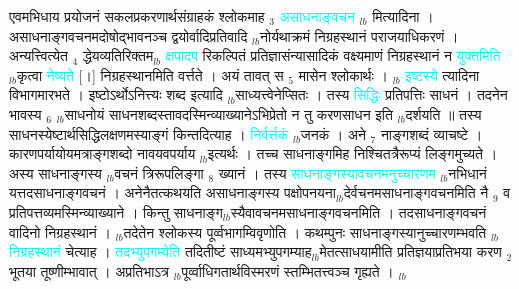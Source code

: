 \documentclass[article,12pt,a4paper]{memoir}%
\newcommand{\quotelemma}[1]{\textcolor{cyan}{#1}}
\newcounter{parCount}
\begin{document}
	  
	  \pstart \leavevmode%
	एवमभिधाय प्रयोजनं सकलप्रकरणार्थसंग्राहकं श्लोकमाह {\tiny $_{3}$} \quotelemma{असाधनाङ्वचन} {\tiny $_{lb}$} \cite[1b1]{vn-msN} मित्यादिना । असाधनाङ्गवचनमदोषोद्भावनञ्च द्वयोर्वादिप्रतिवादि {\tiny $_{lb}$}नोर्यथाक्रमं निग्रहस्थानं पराजयाधिकरणं । अन्यत्त्वित्येत {\tiny $_{4}$} द्धेयव्यतिरिक्तम{\tiny $_{lb}$} \quotelemma{क्षपादप} रिकल्पितं प्रतिज्ञासंन्यासादिकं वक्ष्यमाणं निग्रहस्थानं न \quotelemma{युक्तमिति} {\tiny $_{lb}$}कृत्वा \quotelemma{नेष्यते} [।] निग्रहस्थानमिति वर्त्तते । अयं तावत् स {\tiny $_{5}$} मासेन श्लोकार्थः । {\tiny $_{lb}$} \quotelemma{इष्टस्ये} \cite[1b1]{vn-msN} त्यादिना विभागमारभते । इष्टोऽर्थोऽनित्त्यः शब्द इत्यादि {\tiny $_{lb}$}साध्यत्त्वेनेप्सितः । तस्य \quotelemma{सिद्धिः} प्रतिपत्तिः साधनं । तदनेन भावस्य {\tiny $_{6}$} {\tiny $_{lb}$}साधनोयं साधनशब्दस्तावदस्मिन्व्याख्यानेऽभिप्रेतो न तु करणसाधन इति {\tiny $_{lb}$}दर्शयति ॥ तस्य साधनस्येष्टार्थसिद्धिलक्षणमस्याङ्गं किन्तदित्याह । \quotelemma{निर्वर्त्तकं} {\tiny $_{lb}$}जनकं । अने {\tiny $_{7}$} नाङ्गशब्दं व्याचष्टे । कारणपर्यायोयमत्राङ्गशब्दो नावयवपर्याय {\tiny $_{lb}$}इत्यर्थः । तच्च साधनाङ्गमिह निश्चितत्रैरूप्यं लिङ्गमुच्यते । अस्य साधनाङ्गस्य {\tiny $_{lb}$}वचनं त्रिरूपलिङ्गा {\tiny $_{8}$} ख्यानं । तस्य \quotelemma{साधनाङ्गस्यावचनमनुच्चारणम} \cite[1b2]{vn-msN} {\tiny $_{lb}$}नभिधानं यत्तदसाधनाङ्गवचनं । अनेनैतत्कथयति असाधनाङ्गस्य पक्षोपनयना{\tiny $_{lb}$}देर्वचनमसाधनाङ्गवचनमिति नै {\tiny $_{9}$}\leavevmode{} व प्रतिपत्तव्यमस्मिन्व्याख्याने । किन्तु साधनाङ्ग{\tiny $_{lb}$}स्यैवावचनमसाधनाङ्गवचनमिति । तदसाधनाङ्गवचनं वादिनो निग्रहस्थानं । {\tiny $_{lb}$}तदेतेन श्लोकस्य पूर्व्वभागम्विवृणोति । कथम्पुनः साधनाङ्गस्यानुच्चारणम्भवति {\tiny $_{lb}$} \quotelemma{निग्रहस्थानं} चेत्याह । \quotelemma{तदभ्युपगम्येति} \cite[1b2]{vn-msN} तदितीष्टं साध्यमभ्युपगम्याह{\tiny $_{lb}$}मेतत्साधयामीति प्रतिज्ञयाप्रतिभया करण {\tiny $_{2}$} भूतया तूष्णीम्भावात् । अप्रतिभाऽत्र {\tiny $_{lb}$}पूर्व्वाधिगतार्थविस्मरणं स्तम्भितत्त्वञ्च गृह्यते ।
	{}
	\pend%
      {\tiny $_{lb}$}
\end{document}
